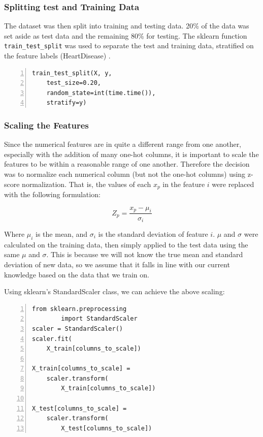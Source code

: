 \documentclass[12pt,conference]{IEEEtran}
\begin{document}
\subsubsection{Splitting test and Training Data}
The dataset was then split into training and testing data. 20\% of the data was set aside as test data and the remaining 80\% for testing. The sklearn function \verb|train_test_split| was used to separate the test and training data, stratified on the feature labels (HeartDisease) \cite{sklearn}. 

\vspace{0.3cm}
\begin{minipage}{0.89\linewidth}
\begin{Verbatim}[numbers=left,framesep=3mm]
train_test_split(X, y, 
    test_size=0.20, 
    random_state=int(time.time()), 
    stratify=y)
\end{Verbatim}
\end{minipage}
\vspace{0.5cm}

\subsubsection{Scaling the Features}
Since the numerical features are in quite a different range from one another, especially with the addition of many one-hot columns, it is important to scale the features to be within a reasonable range of one another. Therefore the decision was to normalize each numerical column (but not the one-hot columns) using z-score normalization. That is, the values of each $x_p$ in the feature $i$ were replaced with the following formulation:

$$ Z_p = \frac{x_p - \mu_i}{\sigma_i} $$

Where $\mu_i$ is the mean, and $\sigma_i$ is the standard deviation of feature $i$. $\mu$ and $\sigma$ were calculated on the training data, then simply applied to the test data using the same $\mu$ and $\sigma$. This is because we will not know the true mean and standard deviation of new data, so we assume that it falls in line with our current knowledge based on the data that we train on.

Using sklearn's StandardScaler class, we can achieve the above scaling:

\vspace{0.3cm}
\begin{minipage}{0.89\linewidth}
\begin{Verbatim}[numbers=left,framesep=3mm]
from sklearn.preprocessing 
        import StandardScaler
scaler = StandardScaler()
scaler.fit(
    X_train[columns_to_scale])

X_train[columns_to_scale] = 
    scaler.transform(
        X_train[columns_to_scale])
        
X_test[columns_to_scale] = 
    scaler.transform(
        X_test[columns_to_scale])
\end{Verbatim}
\end{minipage}
\vspace{0.5cm}
\end{document}
